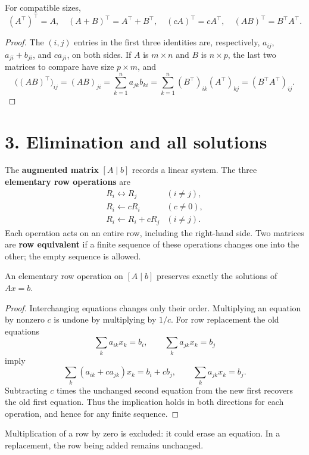 \begin{proposition}\label{prop:01:transpose}
For compatible sizes,
\[
(A^\top)^\top=A,\quad(A+B)^\top=A^\top+B^\top,\quad
(cA)^\top=cA^\top,\quad (AB)^\top=B^\top A^\top.
\]
\end{proposition}
\begin{proof}
The \((i,j)\) entries in the first three identities are, respectively,
\(a_{ij}\), \(a_{ji}+b_{ji}\), and \(ca_{ji}\), on both sides.
If \(A\) is \(m\times n\) and \(B\) is \(n\times p\), the last two
matrices to compare have size \(p\times m\), and
\[
\bigl((AB)^\top\bigr)_{ij}
=(AB)_{ji}=\sum_{k=1}^n a_{jk}b_{ki}
=\sum_{k=1}^n(B^\top)_{ik}(A^\top)_{kj}
=(B^\top A^\top)_{ij}.
\]
\end{proof}

\section*{3. Elimination and all solutions}

The \textbf{augmented matrix} \([A\mid b]\) records a linear system.
The three \textbf{elementary row operations} are
\[
\begin{array}{ll}
R_i\leftrightarrow R_j &(i\ne j),\\
R_i\leftarrow cR_i &(c\ne0),\\
R_i\leftarrow R_i+cR_j &(i\ne j).
\end{array}
\]
Each operation acts on an entire row, including the right-hand side.
Two matrices are \textbf{row equivalent} if a finite sequence of these
operations changes one into the other; the empty sequence is allowed.

\begin{proposition}\label{prop:01:row-operations}
An elementary row operation on \([A\mid b]\) preserves exactly the
solutions of \(Ax=b\).
\end{proposition}
\begin{proof}
Interchanging equations changes only their order. Multiplying an
equation by nonzero \(c\) is undone by multiplying by \(1/c\).
For row replacement the old equations
\[
\sum_k a_{ik}x_k=b_i,\qquad \sum_k a_{jk}x_k=b_j
\]
imply
\[
\sum_k(a_{ik}+ca_{jk})x_k=b_i+cb_j,\qquad
\sum_k a_{jk}x_k=b_j.
\]
Subtracting \(c\) times the unchanged second equation from the new first
recovers the old first equation. Thus the implication holds in both
directions for each operation, and hence for any finite sequence.
\end{proof}
Multiplication of a row by zero is excluded: it could erase an equation.
In a replacement, the row being added remains unchanged.

